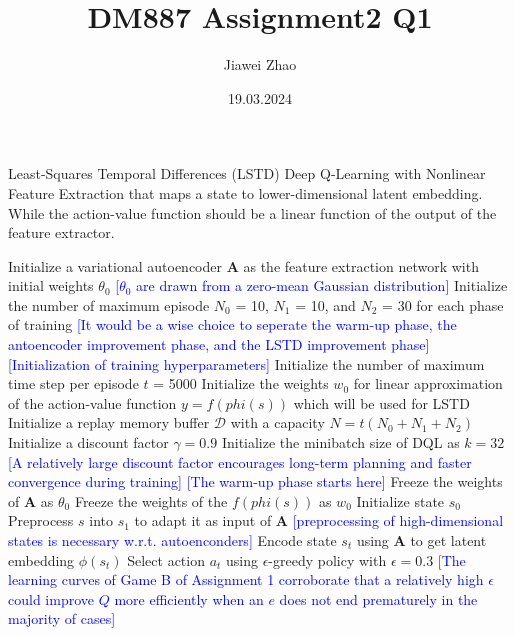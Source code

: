 \documentclass[a4paper,12pt,oneside]{article}
\numberwithin{equation}{section}
\begin{document}
\title{DM887 Assignment2 Q1}
\author{Jiawei Zhao}
\date{19.03.2024}
\maketitle
\newcommand{\mycomment}[1]{{\fontfamily{lmss}\selectfont\textcolor{blue}{[#1]}}} %
    \begin{algorithm}
    \caption {Least-Squares Temporal Differences (LSTD) Deep Q-Learning with Nonlinear Feature Extraction that maps a state to lower-dimensional latent embedding. While the action-value function should be a linear function of the output of the feature extractor.}
        \begin{algorithmic}[1]
        \State Initialize a variational autoencoder $\mathbf{A}$ as the feature extraction network with initial weights $\theta_0$ 
        \mycomment {$\theta_0$ are drawn from a zero-mean Gaussian distribution}
        \State Initialize the number of maximum episode \(N_0\) = 10, \(N_1\) = 10, and \(N_2\) = 30 for each phase of training
        \mycomment {It would be a wise choice to seperate the warm-up phase, the antoencoder improvement phase, and the LSTD improvement phase}
        \mycomment {Initialization of training hyperparameters}
        \State Initialize the number of maximum time step per episode \(t\) = 5000
        \State Initialize the weights \(w_0\) for linear approximation of the action-value function \(y = f(phi(s))\) which will be used for LSTD
        \State Initialize a replay memory buffer $\mathcal{D}$ with a capacity \(N = t (N_0 + N_1 + N_2)\)
        \State Initialize a discount factor $\gamma=0.9$ 
        \State Initialize the minibatch size of DQL as \(k=32\) 
        \mycomment{A relatively large discount factor encourages long-term planning and faster convergence during training}
        \clearpage
        \mycomment {The warm-up phase starts here}
        \State Freeze the weights of $\mathbf{A}$ as $\theta_0$
        \State Freeze the weights of the \(f(phi(s))\) as \(w_0\)
            \State Initialize state \(s_0\) 
            \State Preprocess \(s\) into \(s_1\) to adapt it as input of $\mathbf{A}$
            \mycomment{preprocessing of high-dimensional states is necessary w.r.t. autoenconders}
                \State Encode state \(s_t\) using $\mathbf{A}$ to get latent embedding $\phi(s_t)$
                \State Select action $a_t$ using $\epsilon$-greedy policy with $\epsilon=0.3$
                \mycomment{The learning curves of Game B of Assignment 1 corroborate that a relatively high $\epsilon$ could improve \(Q\) more efficiently when an \(e\) does not end prematurely in the majority of cases}

\end{algorithmic}
\end{algorithm}
\end{document}

